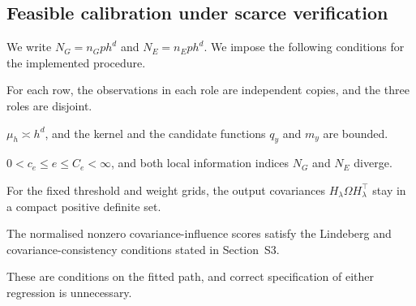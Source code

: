 \subsection{Feasible calibration under scarce verification}
We write $N_G=n_Gph^d$ and $N_E=n_Eph^d$. We impose the following conditions for the implemented procedure.

\begin{assumption}\label{ass:sampling}
For each row, the observations in each role are independent copies, and the three roles are disjoint.
\end{assumption}

\begin{assumption}\label{ass:kernel}
$\mu_h\asymp h^d$, and the kernel and the candidate functions $q_y$ and $m_y$ are bounded.
\end{assumption}

\begin{assumption}\label{ass:verification}
$0<c_e\leq e\leq C_e<\infty$, and both local information indices $N_G$ and $N_E$ diverge.
\end{assumption}

\begin{assumption}\label{ass:covariance}
For the fixed threshold and weight grids, the output covariances $H_\lambda\Omega H_\lambda^\top$ stay in a compact positive definite set.
\end{assumption}

\begin{assumption}\label{ass:scores}
The normalised nonzero covariance-influence scores satisfy the Lindeberg and covariance-consistency conditions stated in Section~S3.
\end{assumption}

These are conditions on the fitted path, and correct specification of either regression is unnecessary.


